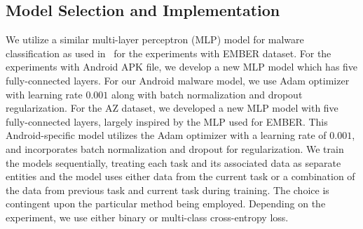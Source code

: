 







\subsection{Model Selection and Implementation}
\label{sec:modelSelectionTraining}

We utilize a similar multi-layer perceptron (MLP) model for malware classification as used in~\cite{continual-learning-malware} for the experiments with EMBER dataset. For the experiments with Android APK file, we develop a new MLP model which has five fully-connected layers. For our Android malware model, we use Adam optimizer with learning rate $0.001$ along with batch normalization and dropout regularization. For the AZ dataset, we developed a new MLP model with five fully-connected layers, largely inspired by the MLP used for EMBER. This Android-specific model utilizes the Adam optimizer with a learning rate of $0.001$, and incorporates batch normalization and dropout for regularization. 
We train the models sequentially, treating each task and its associated data as separate entities and the model uses either data from the current task or a combination of the data from previous task and current task during training. The choice is contingent upon the particular method being employed. Depending on the experiment, we use either binary or multi-class cross-entropy loss.

